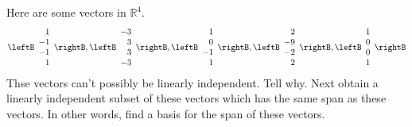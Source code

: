 \begin{enumialphparenastyle}
\begin{ex} Here are some vectors in $\mathbb{R}^{4}$. 
\begin{equation*}
\leftB 
\begin{array}{r}
1 \\ 
-1 \\ 
-1 \\ 
1
\end{array}
\rightB ,\leftB 
\begin{array}{r}
-3 \\ 
3 \\ 
3 \\ 
-3
\end{array}
\rightB ,\leftB 
\begin{array}{r}
1 \\ 
0 \\ 
-1 \\ 
1
\end{array}
\rightB ,\leftB 
\begin{array}{r}
2 \\ 
-9 \\ 
-2 \\ 
2
\end{array}
\rightB ,\leftB 
\begin{array}{r}
1 \\ 
0 \\ 
0 \\ 
1
\end{array}
\rightB 
\end{equation*}
Thse vectors can't possibly be linearly independent. Tell why. Next obtain a
linearly independent subset of these vectors which has the same span as
these vectors. In other words, find a basis for the span of these vectors.
\end{ex}


\end{enumialphparenastyle}
